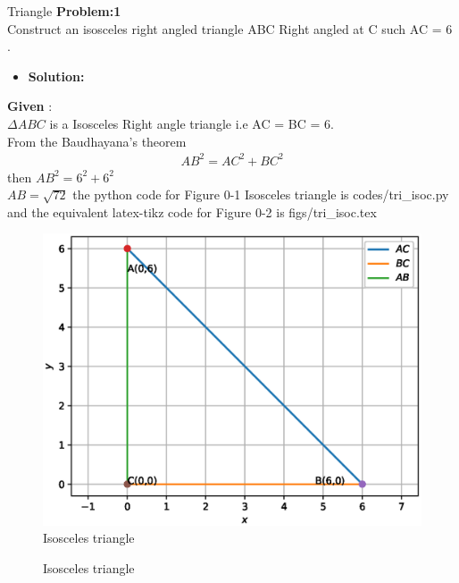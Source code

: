 \begin{frame}{Triangle}
{\textbf{Problem:1}\\Construct an isosceles right angled triangle ABC Right angled at C such AC = 6 . }
\begin{itemize}
\item \textbf{Solution:}
\end{itemize}
\textbf{Given} :\\$\Delta ABC$ is a Isosceles Right angle triangle i.e AC = BC = 6. \\
From the Baudhayana's theorem 
   \begin{align}
   AB^2 = AC^2 + BC^2 
   \end{align}
   then $AB^2 = 6^2 + 6^2 $\\
   $AB = \sqrt{72}$
the python code for  Figure 0-1 Isosceles triangle is codes/tri\_isoc.py\\
and the equivalent latex-tikz code  for Figure 0-2 is figs/tri\_isoc.tex
\end{frame}
\begin{frame}{}
\begin{figure}[!ht]
	\begin{center}
\includegraphics[width=0.8\columnwidth]{./figs/tri_isosc.eps}
	\end{center}
	\caption{Isosceles triangle}
	\label{fig:tri_Isosceles}	
\end{figure}
\end{frame}
\begin{frame}{}
\begin{figure}[!ht]
	\begin{center}
		\resizebox{0.6\columnwidth}{!}{}
	\end{center}
	\caption{Isosceles triangle}
	\label{fig:tri_Isosceles}	
\end{figure}
\end{frame}
